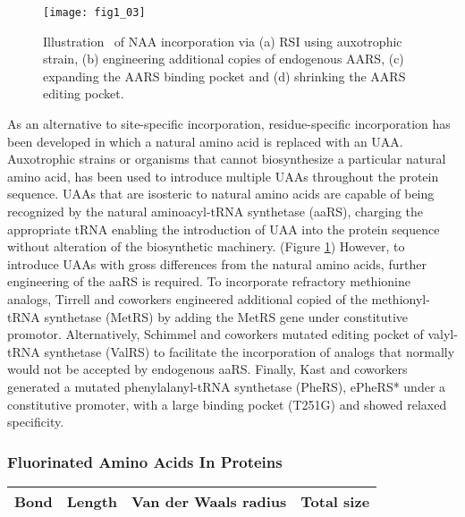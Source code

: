\begin{refsection}
\begin{figure}[h!] \centering \texttt{[image: fig1\_03]} 
    \caption[Illustration  of NAA incorporation via (a) RSI using auxotrophic
    strain, (b) engineering additional copies of endogenous AARS, (c) expanding
the AARS binding pocket and (d) shrinking the AARS editing
pocket.]{Illustration  of NAA incorporation via (a) RSI using auxotrophic
strain, (b) engineering additional copies of endogenous AARS, (c) expanding the
AARS binding pocket and (d) shrinking the AARS editing pocket.} \label{fig:rsi} 
\end{figure}

As an alternative to site-specific incorporation, residue-specific
incorporation has been developed in which a natural amino acid is replaced with
an UAA. Auxotrophic strains or organisms that cannot biosynthesize a particular
natural amino acid, has been used to introduce multiple UAAs throughout the
protein sequence. UAAs that are isosteric to natural amino acids are capable of
being recognized by the natural aminoacyl-tRNA synthetase (aaRS), charging the
appropriate tRNA enabling the introduction of UAA into the protein sequence
without alteration of the biosynthetic machinery. (Figure \ref{fig:rsi})
However, to introduce UAAs with gross differences from the natural amino acids,
further engineering of the aaRS is required. To incorporate refractory
methionine analogs, Tirrell and coworkers engineered additional copied of the
methionyl-tRNA synthetase (MetRS) by adding the MetRS gene under constitutive
promotor\cite{Kiick2000}.  Alternatively, Schimmel and coworkers mutated
editing pocket of valyl-tRNA synthetase (ValRS) to facilitate the incorporation
of analogs that normally would not be accepted by endogenous
aaRS\cite{Doring2001}. Finally, Kast and coworkers generated a mutated
phenylalanyl-tRNA synthetase (PheRS), ePheRS* under a constitutive promoter,
with a large binding pocket (T251G) and showed relaxed
specificity\cite{Kast1991}.

\subsubsection{Fluorinated Amino Acids In Proteins} 
\label{sec:faa-intro}

\begin{table}[h!]
\centering
\begin{tabular}{ llll }
  \hline
  Bond & Length & Van der Waals radius & Total size \\
  \hline


\end{tabular}
\end{table}
\end{refsection}
